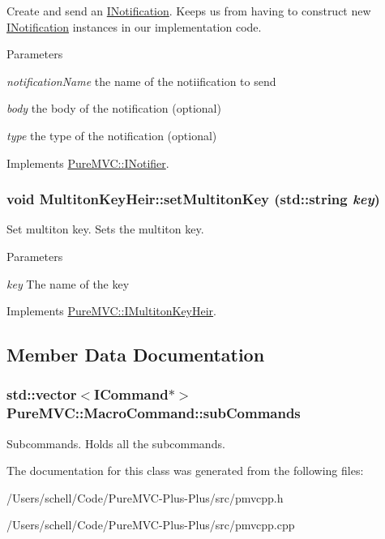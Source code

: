 Create and send an {\ttfamily \hyperlink{class_pure_m_v_c_1_1_i_notification}{INotification}}. Keeps us from having to construct new \hyperlink{class_pure_m_v_c_1_1_i_notification}{INotification} instances in our implementation code. 
\begin{DoxyParams}{Parameters}
\item[{\em notificationName}]the name of the notiification to send \item[{\em body}]the body of the notification (optional) \item[{\em type}]the type of the notification (optional) \end{DoxyParams}


Implements \hyperlink{class_pure_m_v_c_1_1_i_notifier_a65e8333ccfea74138b79f84dac96af25}{PureMVC::INotifier}.\hypertarget{class_pure_m_v_c_1_1_multiton_key_heir_abc70ef7c066bc8d7bf0196ec727599bb}{
\subsubsection[{setMultitonKey}]{\setlength{\rightskip}{0pt plus 5cm}void MultitonKeyHeir::setMultitonKey (std::string {\em key})}}
\label{class_pure_m_v_c_1_1_multiton_key_heir_abc70ef7c066bc8d7bf0196ec727599bb}


Set multiton key. Sets the multiton key. 
\begin{DoxyParams}{Parameters}
\item[{\em key}]The name of the key \end{DoxyParams}


Implements \hyperlink{class_pure_m_v_c_1_1_i_multiton_key_heir_a03acb75ab79defba2c28b8de1bbe1ca6}{PureMVC::IMultitonKeyHeir}.

\subsection{Member Data Documentation}
\hypertarget{class_pure_m_v_c_1_1_macro_command_a31cc41a447ed0be2e994f2f75e3d93c4}{
\subsubsection[{subCommands}]{\setlength{\rightskip}{0pt plus 5cm}std::vector$<${\bf ICommand}$\ast$$>$ {\bf PureMVC::MacroCommand::subCommands}}}
\label{class_pure_m_v_c_1_1_macro_command_a31cc41a447ed0be2e994f2f75e3d93c4}


Subcommands. Holds all the subcommands. 

The documentation for this class was generated from the following files:\begin{DoxyCompactItemize}
\item 
/Users/schell/Code/PureMVC-\/Plus-\/Plus/src/pmvcpp.h\item 
/Users/schell/Code/PureMVC-\/Plus-\/Plus/src/pmvcpp.cpp\end{DoxyCompactItemize}
